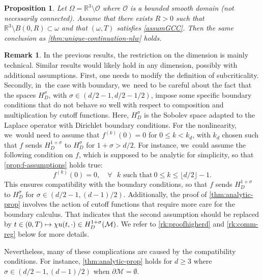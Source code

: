 \documentclass[JEP,XML,SOM,Unicode,published]{cedram}
\newcommand\mto{\mathchoice{\longmapsto}{\mapsto}{\mapsto}{\mapsto}}
\newtheorem{proposition}[theorem]{Proposition}
\theoremstyle{definition}
\newtheorem{remark}[theorem]{Remark}
\let\mc\mathcal
\newcommand{\M}{\mc{M}}
\newcommand{\R}{\mathbb{R}}
\begin{document}
\begin{proposition}
\label{propR3obstacle}
Let $\Omega=\R^3\setminus \mathcal{O}$ where $\mathcal{O}$ is a bounded smooth domain (not necessarily connected). Assume that there exists $R>0$ such that $\R^3\setminus B(0,R)\subset \omega$ and that $(\omega,T)$ satisfies \ref{assumGCC}. Then the same conclusion as \cref{thm:unique-continuation-nlw} holds.
\end{proposition}
\begin{remark}
\label{rk:higherd}
In the previous results, the restriction on the dimension is mainly technical. Similar results would likely hold in any dimension, possibly with additional assumptions. First, one needs to modify the definition of subcriticality. Secondly, in~the case with boundary, we~need to be careful about the fact that the spaces $H^{\sigma}_D$, with $\sigma \in (d/2-1,d/2-1/2)$, impose some specific boundary conditions that do not behave so well with respect to composition and multiplication by cutoff functions. Here, $H^{\sigma}_D$ is the Sobolev space adapted to the Laplace operator with Dirichlet boundary conditions. For the nonlinearity, we~would need to assume that $f^{(k)}(0)=0$ for \hbox{$0\leq k<k_d$}, with $k_d$ chosen such that $f$ sends $H^{1+\sigma}_D$ to $H^{\sigma}_D$ for $1+\sigma>d/2$.
For instance, we~could assume the following condition on $f$, which is supposed to be analytic for simplicity, so that \cref{prop:f-assumptions} holds true:
\begin{equation*}
f^{(k)}(0)=0, \quad \forall\text{ $k$ such that}~0\leq k\leq \lfloor d/2\rfloor-1.
\end{equation*}
This ensures compatibility with the boundary conditions, so that $f$ sends $H^{1+\sigma}_D$ to $H^{\sigma}_D$ for $\sigma\in (d/2-1, (d-1)/2)$. Additionally, the proof of \cref{thm:analytic-prop} involves the action of cutoff functions that require more care for the boundary calculus. That indicates that the second assumption should be replaced by $t\in (0, T)\mto \chi u(t,\cdot)\in H^{1+\sigma}_D(\M)$.
We refer to \cref{rk:proofhigherd} and \cref{rk:comm-reg} below for more details.

Nevertheless, many of these complications are caused by the compatibility conditions. For instance, \cref{thm:analytic-prop} holds for $d\geq 3$ where $\sigma\in (d/2-1, (d-1)/2)$ when $\partial\M=\emptyset$.
\end{remark}
\end{document}
